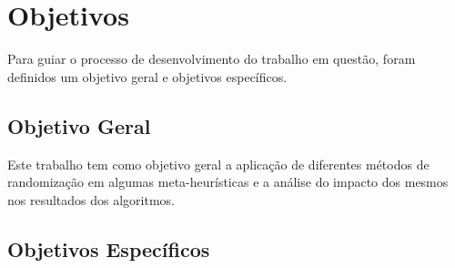 

\section{Objetivos}

Para guiar o processo de desenvolvimento do trabalho em questão, foram definidos um objetivo geral e objetivos específicos.

\subsection{Objetivo Geral}

Este trabalho tem como objetivo geral a aplicação de diferentes métodos de randomização em algumas meta-heurísticas e a análise do impacto dos mesmos nos resultados dos algoritmos.

\subsection{Objetivos Específicos}

